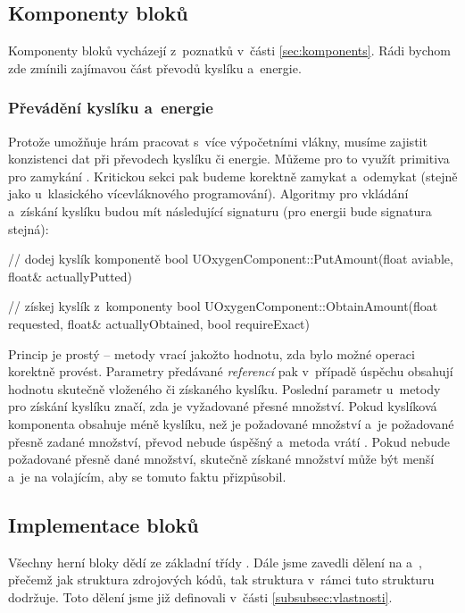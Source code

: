 \subsection{Komponenty bloků}
Komponenty bloků vycházejí z~poznatků v~části \ref{sec:komponents}. Rádi bychom zde zmínili zajímavou část převodů kyslíku a~energie.


\subsubsection{Převádění kyslíku a~energie}
Protože \UE{} umožňuje hrám pracovat s~více výpočetními vlákny, musíme zajistit konzistenci dat při převodech kyslíku či energie. Můžeme pro to využít primitiva pro zamykání . Kritickou sekci pak budeme korektně zamykat a~odemykat (stejně jako u~klasického vícevláknového programování). Algoritmy pro vkládání a~získání kyslíku budou mít následující signaturu (pro energii bude signatura stejná):

\begin{code}
    // dodej kyslík komponentě
    bool UOxygenComponent::PutAmount(float aviable,
                                     float& actuallyPutted)

    // získej kyslík z~komponenty                                     
    bool UOxygenComponent::ObtainAmount(float requested,
                                        float& actuallyObtained,
                                        bool requireExact)
\end{code}


Princip je prostý -- metody vrací  jakožto hodnotu, zda bylo možné operaci korektně provést. Parametry předávané \textit{referencí} pak v~případě úspěchu obsahují hodnotu skutečně vloženého či získaného kyslíku. Poslední parametr u~metody pro získání kyslíku značí, zda je vyžadované přesné množství. Pokud kyslíková komponenta obsahuje méně kyslíku, než je požadované množství a~je požadované přesně zadané množství, převod nebude úspěšný a~metoda vrátí . Pokud nebude požadované přesně dané množství, skutečně získané množství může být menší a~je na volajícím, aby se tomuto faktu přizpůsobil.


\subsection{Implementace bloků}
\label{subsec:blImp}

Všechny herní bloky dědí ze základní třídy . Dále jsme zavedli dělení na  a~, přečemž jak struktura zdrojových kódů, tak struktura v~rámci \UEu{} tuto strukturu dodržuje. Toto dělení jsme již definovali v~části \ref{subsubsec:vlastnosti}.

